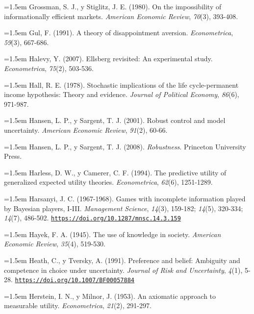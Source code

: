 \documentclass[10pt,a4paper]{article}
\begin{document}
\noindent\hangindent=1.5em Grossman, S. J., y Stiglitz, J. E. (1980). On the impossibility of informationally efficient markets. \textit{American Economic Review}, \textit{70}(3), 393-408.

\noindent\hangindent=1.5em Gul, F. (1991). A theory of disappointment aversion. \textit{Econometrica}, \textit{59}(3), 667-686.

\noindent\hangindent=1.5em Halevy, Y. (2007). Ellsberg revisited: An experimental study. \textit{Econometrica}, \textit{75}(2), 503-536.

\noindent\hangindent=1.5em Hall, R. E. (1978). Stochastic implications of the life cycle-permanent income hypothesis: Theory and evidence. \textit{Journal of Political Economy}, \textit{86}(6), 971-987.

\noindent\hangindent=1.5em Hansen, L. P., y Sargent, T. J. (2001). Robust control and model uncertainty. \textit{American Economic Review}, \textit{91}(2), 60-66.

\noindent\hangindent=1.5em Hansen, L. P., y Sargent, T. J. (2008). \textit{Robustness}. Princeton University Press.

\noindent\hangindent=1.5em Harless, D. W., y Camerer, C. F. (1994). The predictive utility of generalized expected utility theories. \textit{Econometrica}, \textit{62}(6), 1251-1289.

\noindent\hangindent=1.5em Harsanyi, J. C. (1967-1968). Games with incomplete information played by Bayesian players, I-III. \textit{Management Science}, \textit{14}(3), 159-182; \textit{14}(5), 320-334; \textit{14}(7), 486-502. \href{https://doi.org/10.1287/mnsc.14.3.159}{\nolinkurl{https://doi.org/10.1287/mnsc.14.3.159}}

\noindent\hangindent=1.5em Hayek, F. A. (1945). The use of knowledge in society. \textit{American Economic Review}, \textit{35}(4), 519-530.

\noindent\hangindent=1.5em Heath, C., y Tversky, A. (1991). Preference and belief: Ambiguity and competence in choice under uncertainty. \textit{Journal of Risk and Uncertainty}, \textit{4}(1), 5-28. \href{https://doi.org/10.1007/BF00057884}{\nolinkurl{https://doi.org/10.1007/BF00057884}}

\noindent\hangindent=1.5em Herstein, I. N., y Milnor, J. (1953). An axiomatic approach to measurable utility. \textit{Econometrica}, \textit{21}(2), 291-297.
\end{document}
